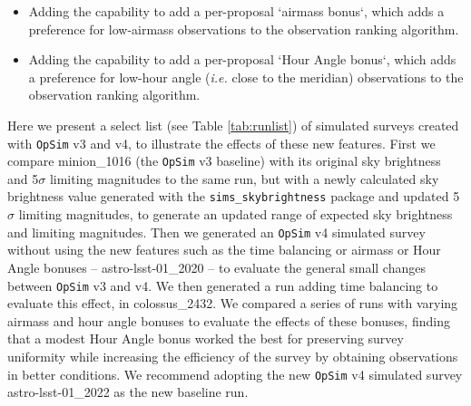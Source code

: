 \documentclass[DM,lsstdraft,authoryear,toc]{lsstdoc}
\newcommand{\opsim}{\texttt{OpSim}\xspace}
\newcommand{\simsky}{\texttt{sims\_skybrightness}\xspace}
\begin{document}
\begin{itemize}
\item Adding the capability to add a per-proposal `airmass bonus`, which adds a preference for low-airmass observations to the observation ranking algorithm.
\item Adding the capability to add a per-proposal `Hour Angle bonus`, which adds a preference for low-hour angle ({\it i.e.} close to the meridian) observations to the observation ranking algorithm.
\end{itemize}

Here we present a select list (see Table \ref{tab:runlist}) of simulated surveys created with \opsim v3 and v4, to illustrate the effects of these new features. First we compare minion\_1016 (the \opsim v3 baseline) with its original sky brightness and 5$\sigma$ limiting magnitudes to the same run, but with a newly calculated sky brightness value generated with the \simsky package and updated 5$\sigma$ limiting magnitudes, to generate an updated range of expected sky brightness and limiting magnitudes. Then we generated an \opsim v4 simulated survey without using the new features such as the time balancing or airmass or Hour Angle bonuses -- astro-lsst-01\_2020 -- to evaluate the general small changes between \opsim v3 and v4. We then generated a run adding time balancing to evaluate this effect, in colossus\_2432.  We compared a series of runs with varying airmass and hour angle bonuses to evaluate the effects of these bonuses, finding that a modest Hour Angle bonus worked the best for preserving survey uniformity while increasing the efficiency of the survey by obtaining observations in better conditions. We recommend adopting the new \opsim v4 simulated survey astro-lsst-01\_2022 as the new baseline run.
\end{document}
